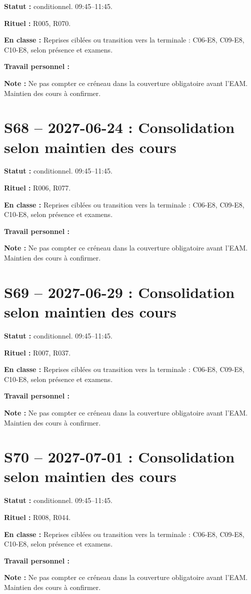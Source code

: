 \textbf{Statut :} conditionnel. 09:45–11:45.\par\textbf{Rituel :} R005, R070.\par\textbf{En classe :} Reprises ciblées ou transition vers la terminale : C06-E8, C09-E8, C10-E8, selon présence et examens.\par\textbf{Travail personnel :} \par\textbf{Note :} Ne pas compter ce créneau dans la couverture obligatoire avant l’EAM. Maintien des cours à confirmer.
\section*{S68 -- 2027-06-24 : Consolidation selon maintien des cours}
\textbf{Statut :} conditionnel. 09:45–11:45.\par\textbf{Rituel :} R006, R077.\par\textbf{En classe :} Reprises ciblées ou transition vers la terminale : C06-E8, C09-E8, C10-E8, selon présence et examens.\par\textbf{Travail personnel :} \par\textbf{Note :} Ne pas compter ce créneau dans la couverture obligatoire avant l’EAM. Maintien des cours à confirmer.
\section*{S69 -- 2027-06-29 : Consolidation selon maintien des cours}
\textbf{Statut :} conditionnel. 09:45–11:45.\par\textbf{Rituel :} R007, R037.\par\textbf{En classe :} Reprises ciblées ou transition vers la terminale : C06-E8, C09-E8, C10-E8, selon présence et examens.\par\textbf{Travail personnel :} \par\textbf{Note :} Ne pas compter ce créneau dans la couverture obligatoire avant l’EAM. Maintien des cours à confirmer.
\section*{S70 -- 2027-07-01 : Consolidation selon maintien des cours}
\textbf{Statut :} conditionnel. 09:45–11:45.\par\textbf{Rituel :} R008, R044.\par\textbf{En classe :} Reprises ciblées ou transition vers la terminale : C06-E8, C09-E8, C10-E8, selon présence et examens.\par\textbf{Travail personnel :} \par\textbf{Note :} Ne pas compter ce créneau dans la couverture obligatoire avant l’EAM. Maintien des cours à confirmer.
